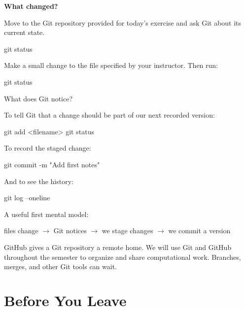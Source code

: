 \documentclass[11pt]{article}
\begin{document}
\begin{center}
\Large\bfseries What changed?
\end{center}

Move to the Git repository provided for today's exercise and ask Git about
its current state.

\begin{terminal}
git status
\end{terminal}

Make a small change to the file specified by your instructor. Then run:

\begin{terminal}
git status
\end{terminal}

What does Git notice?

\vspace{0.45in}

To tell Git that a change should be part of our next recorded version:

\begin{terminal}
git add <filename>
git status
\end{terminal}

To record the staged change:

\begin{terminal}
git commit -m "Add first notes"
\end{terminal}

And to see the history:

\begin{terminal}
git log --oneline
\end{terminal}

\begin{checkpoint}
A useful first mental model:

\begin{center}
files change $\longrightarrow$ Git notices $\longrightarrow$
we stage changes $\longrightarrow$ we commit a version
\end{center}
\end{checkpoint}

GitHub gives a Git repository a remote home. We will use Git and GitHub
throughout the semester to organize and share computational work. Branches,
merges, and other Git tools can wait.

\section{Before You Leave}
\end{document}
